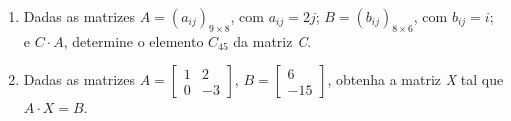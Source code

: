 \begin{enumerate}[label*=\protect\fbox{\arabic{enumi}}]
{      \begin{tasks}(5)
      \end{tasks}
    }

  \item {
      Dadas as matrizes $A = (a_{ij})_{9 \times 8}$, com $a_{ij} = 2j$; $B = (b_{ij})_{8 \times 6}$, com $b_{ij} = i$; e $C \cdot A$,
      determine o elemento $C_{45}$ da matriz \textit{C}.
    }

  \item {
      Dadas as matrizes $A = \begin{bmatrix}
        1 & 2\\
        0 & -3
      \end{bmatrix}$, $B = \begin{bmatrix}
        6 \\
        -15
      \end{bmatrix}$, obtenha a matriz \textit{X} tal que $A \cdot X = B$.
    }
\end{enumerate}





